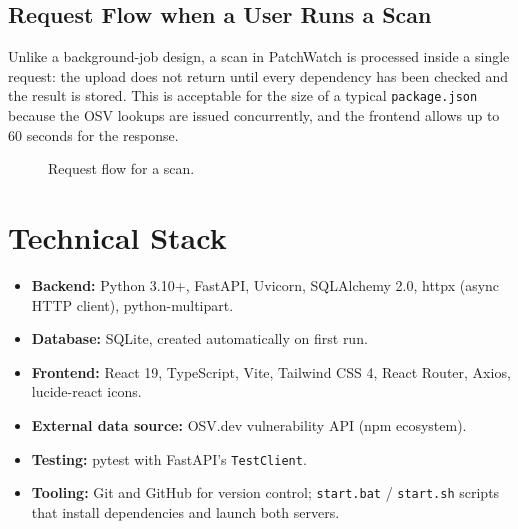 \documentclass[12pt,a4paper]{report}
\begin{document}
\subsection{Request Flow when a User Runs a Scan}
Unlike a background-job design, a scan in PatchWatch is processed inside a single request: the upload does not return until every dependency has been checked and the result is stored. This is acceptable for the size of a typical \texttt{package.json} because the OSV lookups are issued concurrently, and the frontend allows up to 60 seconds for the response.

\begin{figure}[htbp]
\centering
{}
\caption{Request flow for a scan.}
\end{figure}

\section{Technical Stack}
\begin{itemize}[leftmargin=*]
  \item \textbf{Backend:} Python 3.10+, FastAPI, Uvicorn, SQLAlchemy 2.0, httpx (async HTTP client), python-multipart.
  \item \textbf{Database:} SQLite, created automatically on first run.
  \item \textbf{Frontend:} React 19, TypeScript, Vite, Tailwind CSS 4, React Router, Axios, lucide-react icons.
  \item \textbf{External data source:} OSV.dev vulnerability API (npm ecosystem).
  \item \textbf{Testing:} pytest with FastAPI's \texttt{TestClient}.
  \item \textbf{Tooling:} Git and GitHub for version control; \texttt{start.bat} / \texttt{start.sh} scripts that install dependencies and launch both servers.
\end{itemize}
\end{document}
